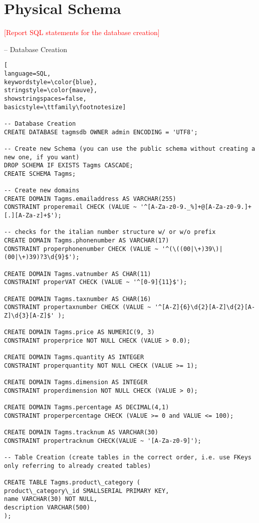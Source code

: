 \section{Physical Schema}
\textcolor{red}{[Report SQL statements for the database creation]}

-- Database Creation
\begin{lstlisting}[
language=SQL,
keywordstyle=\color{blue},
stringstyle=\color{mauve},
showstringspaces=false,
basicstyle=\ttfamily\footnotesize]

-- Database Creation
CREATE DATABASE tagmsdb OWNER admin ENCODING = 'UTF8';

-- Create new Schema (you can use the public schema without creating a new one, if you want)
DROP SCHEMA IF EXISTS Tagms CASCADE;
CREATE SCHEMA Tagms;

-- Create new domains
CREATE DOMAIN Tagms.emailaddress AS VARCHAR(255)
CONSTRAINT properemail CHECK (VALUE ~ '^[A-Za-z0-9._%]+@[A-Za-z0-9.]+[.][A-Za-z]+$');

-- checks for the italian number structure w/ or w/o prefix
CREATE DOMAIN Tagms.phonenumber AS VARCHAR(17)
CONSTRAINT properphonenumber CHECK (VALUE ~ '^(\((00|\+)39\)|(00|\+)39)?3\d{9}$');

CREATE DOMAIN Tagms.vatnumber AS CHAR(11)
CONSTRAINT properVAT CHECK (VALUE ~ '^[0-9]{11}$');

CREATE DOMAIN Tagms.taxnumber AS CHAR(16)
CONSTRAINT propertaxnumber CHECK (VALUE ~ '^[A-Z]{6}\d{2}[A-Z]\d{2}[A-Z]\d{3}[A-Z]$' );

CREATE DOMAIN Tagms.price AS NUMERIC(9, 3)
CONSTRAINT properprice NOT NULL CHECK (VALUE > 0.0);

CREATE DOMAIN Tagms.quantity AS INTEGER
CONSTRAINT properquantity NOT NULL CHECK (VALUE >= 1);

CREATE DOMAIN Tagms.dimension AS INTEGER
CONSTRAINT properdimension NOT NULL CHECK (VALUE > 0);

CREATE DOMAIN Tagms.percentage AS DECIMAL(4,1)
CONSTRAINT properpercentage CHECK (VALUE >= 0 and VALUE <= 100);

CREATE DOMAIN Tagms.tracknum AS VARCHAR(30)
CONSTRAINT propertracknum CHECK(VALUE ~ '[A-Za-z0-9]');

-- Table Creation (create tables in the correct order, i.e. use FKeys only referring to already created tables)

CREATE TABLE Tagms.product\_category (
product\_category\_id SMALLSERIAL PRIMARY KEY,
name VARCHAR(30) NOT NULL,
description VARCHAR(500)
);


\end{lstlisting}
